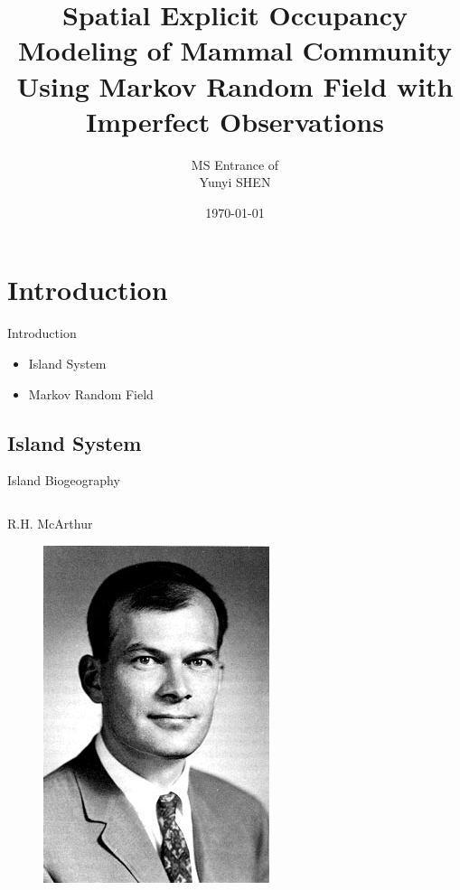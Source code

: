 \documentclass{beamer}
\title{Spatial Explicit Occupancy Modeling of Mammal Community Using Markov Random Field with Imperfect Observations}
\author{MS Entrance of \\Yunyi SHEN}
\institute{UW Madison\\ Department of Forest and Wildlife Ecology}
\date{\today}
\begin{document}
\frame{\titlepage}
\frame{\tableofcontents}

\section{Introduction}
\begin{frame}{Introduction}
	\begin{itemize}
		\item Island System
		\item Markov Random Field
	\end{itemize}
\end{frame}
\subsection{Island System} 
\begin{frame}{Island Biogeography}
	\begin{columns}
		\begin{block}{R.H. McArthur}
			\begin{figure}[ht]
				\centering
				\includegraphics[scale=0.8]{fig/APIS/MacArthur.jpg}
				\label{R.H. McArthur}
			\end{figure}
		\end{block}
		

\end{columns}
\end{frame}
\end{document}
